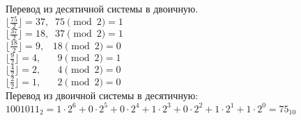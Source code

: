 \documentclass[12pt]{article}
\begin{document}
	Перевод из десятичной системы в двоичную. \\
\noindent $\lfloor \displaystyle \frac{75}{2} \rfloor = 37, \; \; 75\pmod {2} = 1$ \\
$\lfloor \displaystyle \frac{37}{2} \rfloor = 18, \; \; 37\pmod {2} = 1$ \\
$\lfloor \displaystyle \frac{18}{2} \rfloor = 9, \; \; \; 18\pmod {2} = 0$ \\
$\lfloor \displaystyle \frac{9}{2} \rfloor = 4, \; \;\;\;\;\; 9\pmod {2} = 1$ \\
$\lfloor \displaystyle \frac{4}{2} \rfloor = 2, \; \;\;\;\;\; 4\pmod {2} = 0$ \\
$\lfloor \displaystyle \frac{2}{2} \rfloor = 1, \; \;\;\;\;\; 2\pmod {2} = 0$ \\
    Перевод из двоичной системы в десятичную: \\
    $ 1001011_2 = 1\cdot2^6+0\cdot2^5+0\cdot2^4+1\cdot2^3+0\cdot2^2+1\cdot2^1+1\cdot2^0=75_{10} $
\end{document}

